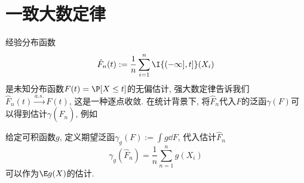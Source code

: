 \section{一致大数定律}

经验分布函数
\begin{equation*}
	\hat F_n(t) := \frac{1}{n} \sum_{i=1}^n \I{(-\infty], t]}(X_i)
\end{equation*}
是未知分布函数$F(t) = \P[ X \leq t ]$的无偏估计, 强大数定律告诉我们$\hat F_n(t) \stackrel{a.s.}{\to} F(t)$, 这是一种逐点收敛. 
在统计背景下,  将$\hat F_n$代入$F$的泛函$\gamma(F)$可以得到估计$\gamma(\hat F_n)$, 例如

\begin{example}
	给定可积函数$g$, 定义期望泛函$\gamma_g(F) := \int g \dd F$, 代入估计$\hat F_n$
	\begin{equation*}
		\gamma_g(\hat F_n) = \frac{1}{n} \sum_{n=1}^n g(X_i)
	\end{equation*}
	可以作为$\E g(X)$的估计. 
\end{example}